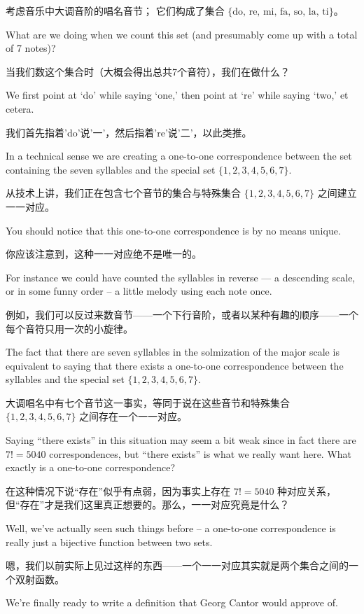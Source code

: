 考虑音乐中大调音阶的唱名音节；
它们构成了集合 $\{\mbox{do, re, mi, fa, so, la, ti}\}$。

What are we doing when
we count this set (and presumably come up with a total of 7 notes)?

当我们数这个集合时（大概会得出总共7个音符），我们在做什么？

We first
point at `do' while saying `one,' then point at `re' while saying `two,'
et cetera.

我们首先指着'do'说'一'，然后指着're'说'二'，以此类推。

In a technical sense we are creating a one-to-one correspondence between the
set containing the seven syllables and the special set $\{1, 2, 3, 4, 5, 6, 7\}$.

从技术上讲，我们正在包含七个音节的集合与特殊集合 $\{1, 2, 3, 4, 5, 6, 7\}$ 之间建立一一对应。

You should notice that this one-to-one correspondence is by no means unique.

你应该注意到，这种一一对应绝不是唯一的。

For
instance we could have counted the syllables in reverse --- a descending scale,
or in some funny order -- a little melody using each note once.

例如，我们可以反过来数音节——一个下行音阶，或者以某种有趣的顺序——一个每个音符只用一次的小旋律。

The fact that
there are seven syllables in the solmization of the major scale is equivalent
to saying that there exists a one-to-one correspondence between the syllables
and the special set $\{1, 2, 3, 4, 5, 6, 7\}$.

大调唱名中有七个音节这一事实，等同于说在这些音节和特殊集合 $\{1, 2, 3, 4, 5, 6, 7\}$ 之间存在一个一一对应。

Saying ``there exists'' in this situation may seem a bit weak since in fact there are $7!
    = 5040$ correspondences, but ``there exists'' is what we really want here.  What exactly is a one-to-one
correspondence?

在这种情况下说“存在”似乎有点弱，因为事实上存在 $7! = 5040$ 种对应关系，但“存在”才是我们这里真正想要的。那么，一一对应究竟是什么？

Well, we've actually seen such things before -- a one-to-one
correspondence is really just a bijective function between two sets.

嗯，我们以前实际上见过这样的东西——一个一一对应其实就是两个集合之间的一个双射函数。

We're
finally ready to write a definition that Georg Cantor would approve of.

